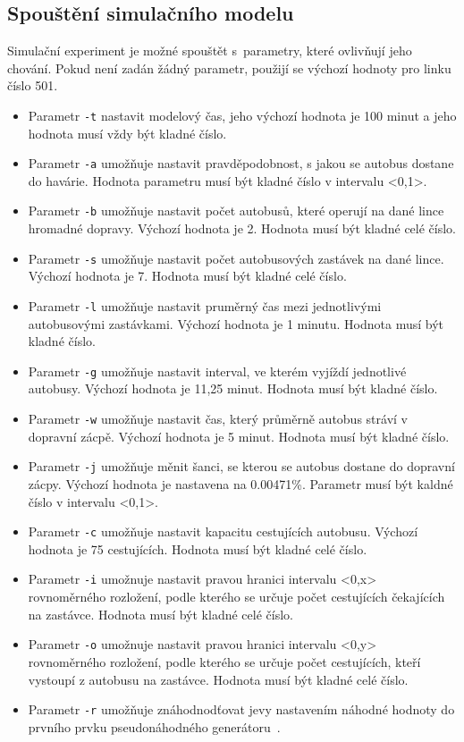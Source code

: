 \documentclass[a4paper]{article}
\begin{document}
        \subsection{Spouštění simulačního modelu}
        \label{subsec:start}

            Simulační experiment je možné spouštět s~parametry, které ovlivňují jeho chování. Pokud není zadán žádný parametr, použijí se výchozí hodnoty pro linku číslo 501.
            
            \begin{itemize}
                \item Parametr \texttt{-t}  nastavit modelový čas, jeho výchozí hodnota je 100 minut a jeho hodnota musí vždy být kladné číslo.
                \item Parametr \texttt{-a} umožňuje nastavit pravděpodobnost, s jakou se autobus dostane do havárie. Hodnota parametru musí být kladné číslo v intervalu <0,1>.
                \item Parametr \texttt{-b} umožňuje nastavit počet autobusů, které operují na dané lince hromadné dopravy. Výchozí hodnota je 2. Hodnota musí být kladné celé číslo.
                \item Parametr \texttt{-s} umožňuje nastavit počet autobusových zastávek na dané lince. Výchozí hodnota je 7. Hodnota musí být kladné celé číslo.
                \item Parametr \texttt{-l} umožňuje nastavit pruměrný čas mezi jednotlivými autobusovými zastávkami. Výchozí hodnota je 1 minutu. Hodnota musí být kladné číslo.
                \item Parametr \texttt{-g} umožňuje nastavit interval, ve kterém vyjíždí jednotlivé autobusy. Výchozí hodnota je 11,25 minut. Hodnota musí být kladné číslo.
                \item Parametr \texttt{-w} umožňuje nastavit čas, který průměrně autobus stráví v dopravní zácpě. Výchozí hodnota je 5 minut. Hodnota musí být kladné číslo.
                \item Parametr \texttt{-j} umožňuje měnit šanci, se kterou se autobus dostane do dopravní zácpy. Výchozí hodnota je nastavena na 0.00471\%. Parametr musí být kaldné číslo v intervalu <0,1>.
                \item Parametr \texttt{-c} umožňuje nastavit kapacitu cestujících autobusu. Výchozí hodnota je 75 cestujících. Hodnota musí být kladné  celé číslo.
            
            \item Parametr \texttt{-i} umožnuje nastavit pravou hranici intervalu <0,x> rovnoměrného rozložení, podle kterého se určuje počet cestujících čekajících na zastávce. Hodnota musí být kladné celé číslo.
            \item Parametr \texttt{-o} umožnuje nastavit pravou hranici intervalu <0,y> rovnoměrného rozložení, podle kterého se určuje počet cestujících, kteří vystoupí z autobusu na zastávce. Hodnota musí být kladné celé číslo.
            \item Parametr \texttt{-r} umožňuje znáhodnodťovat jevy nastavením náhodné hodnoty do prvního prvku pseudonáhodného generátoru~\cite[snímek 72]{IMS_slides}. 
            \end{itemize}
\end{document}
